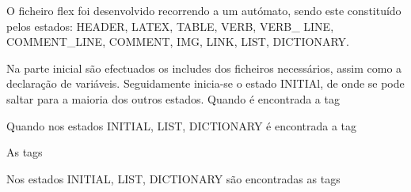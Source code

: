 \documentclass[11pt,a4paper]{article}
\begin{document}
O ficheiro flex foi desenvolvido recorrendo a um autómato, sendo este constituído pelos estados: HEADER, LATEX, TABLE, VERB, VERB\_ LINE, COMMENT\_LINE, COMMENT, IMG, LINK, LIST, DICTIONARY.

Na parte inicial são efectuados os includes dos ficheiros necessários, assim como a declaração de variáveis. Seguidamente inicia-se o estado INITIAl, de onde se pode saltar para a maioria dos outros estados. Quando é encontrada a tag \verb@ %%header% @, ele automaticamente inicia o estado HEADER. Neste estado, podem-se encontrar as tags \verb@ %title @, \verb@ %author @ e \verb@ %date @, que dizem respeito ao título, autor e data do documento, respectivamente. Ainda no estado INITIAl, quando são encontradas as tags \verb@ %t[1-3] @, \verb@ %index% @, \verb@ %cover% @, são adicionados o título, o índice e a capa do documento ao ficheiro final.

Quando nos estados INITIAL, LIST, DICTIONARY é encontrada a tag \verb@ %%ol% @ e \verb@ %%ul% @, inicia-se o estado LIST, onde se inicia o inicício de listas ordenadas e listas não ordenadas, respectivamente. Entretanto, dentro do estado LIST, quando encontrado a tag \verb@ %ol%% @ e \verb@ %ul%% @, dá-se o fim das duas listas, e volta-se para o estado anterior. As listas descritivas caracterizadas pela tag \verb@ %%dl% @, funcionam de forma análoga, contudo, neste caso, inicia-se o estado DICTIONARY. Neste último estado, juntamente com o estado LIST, quando encontradas as tags \verb@ %it @, possibilitam a inserção de itens dentros das respectivas listas.

As tags \verb@ %b @, \verb@ %i @ e \verb@ %u @ representam os diversos tipos de formatação do texto, nomeadamente, texto escrito em negrito, texto escrito em itálico e texto sublinhado. Estas são inicializadas quando encontrados os estados INITIAl, LIST, DICTIONARY, querendo isto dizer que é possível inserir texto formatado em qualquer parte do texto, dentro de listas e dentro de entradas de dicionário.

Nos estados INITIAL, LIST, DICTIONARY são encontradas as tags \verb@ %img @ e \verb@ %link% @, é iniciado o estado IMG e LINK, respectivamente. Ainda nestes últimos três estados podem encontrar-se as tags  \verb@ %%% @ e \verb@ %%comment% @, que dizem respeitos aos comentários de linha e multi-linha, iniciando-se os estados COMMENT\_LINE e COMMENT, respectivamente. Dentro do estado COMMENT\_LINE, quando é encontrado a tag \verb@ \n @, significa que o comentário de linha termina ali, e então volta-se para o estado anterior. Em relação ao estado COMMENT, este funciona de forma análoga ao anterior, contudo volta ao estado anterior quando encontra a tag \verb@ %comment%% @. Relativamente aos estados VERB e VERB LINE, que dizem repseito ao verbatim multi-linha e verbatim de linha, funcionam de forma idêntica ao estados anteriores.
\end{document}
